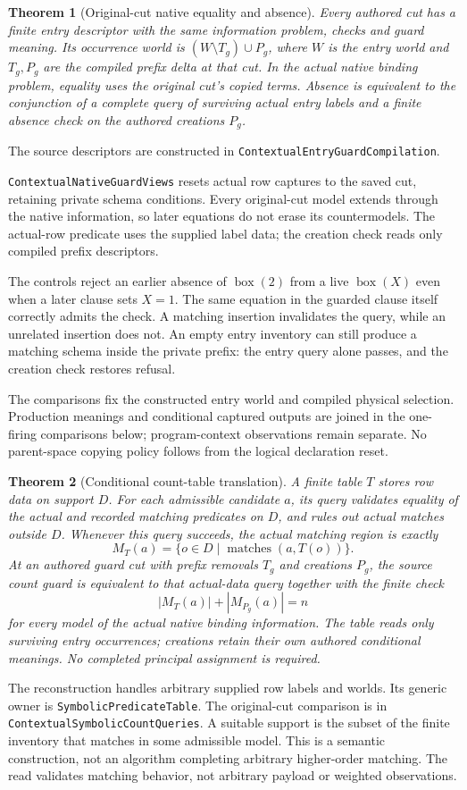 \documentclass[11pt]{article}
\newtheorem{theorem}{Theorem}
\newcommand{\code}[1]{\texttt{\small #1}}
\begin{document}
\begin{theorem}[Original-cut native equality and absence]
Every authored cut has a finite entry descriptor with the same information
problem, checks and guard meaning. Its occurrence world is
$(W\setminus T_g)\cup P_g$, where $W$ is the entry world and $T_g,P_g$ are
the compiled prefix delta at that cut. In the actual native binding
problem, equality uses the original cut's copied terms. Absence is
equivalent to the conjunction of a complete query of surviving actual
entry labels and a finite absence check on the authored creations $P_g$.
\end{theorem}
The source descriptors are constructed in
\code{ContextualEntryGuardCompilation}.

\code{ContextualNativeGuardViews} resets actual row captures to the saved
cut, retaining private schema conditions. Every original-cut model extends
through the native information, so later equations do not erase its
countermodels. The actual-row predicate uses the supplied label data;
the creation check reads only compiled prefix descriptors.

The controls reject an earlier absence of $\operatorname{box}(2)$ from a
live $\operatorname{box}(X)$ even when a later clause sets $X=1$.
The same equation in the guarded clause itself correctly admits the check.
A matching insertion invalidates the query, while an unrelated insertion
does not. An empty entry inventory can still produce a matching schema
inside the private prefix: the entry query alone passes, and the creation
check restores refusal.

The comparisons fix the constructed entry world and compiled physical
selection. Production meanings and conditional captured outputs are joined
in the one-firing comparisons below; program-context observations remain
separate. No parent-space copying policy follows
from the logical declaration reset.

\begin{theorem}[Conditional count-table translation]
A finite table $T$ stores row data on support $D$. For each admissible
candidate $a$, its query validates equality of the actual and recorded
matching predicates on $D$, and rules out actual matches outside $D$.
Whenever this query succeeds, the actual matching region is exactly
\[
 M_T(a)=\{o\in D\mid\operatorname{matches}(a,T(o))\}.
\]
At an authored guard cut with prefix removals $T_g$ and creations $P_g$,
the source count guard is equivalent to that actual-data query together
with the finite check
\[
 |M_T(a)|+|M_{P_g}(a)|=n
\]
for every model of the actual native binding information. The table reads
only surviving entry occurrences; creations retain their own authored
conditional meanings. No completed principal assignment is required.
\end{theorem}
The reconstruction handles arbitrary supplied row labels and worlds.
Its generic owner is \code{SymbolicPredicateTable}.
The original-cut comparison is in
\code{ContextualSymbolicCountQueries}. A suitable support is the subset of
the finite inventory that matches in some admissible model. This is a
semantic construction, not an algorithm completing arbitrary higher-order
matching. The read validates matching behavior, not arbitrary payload or
weighted observations.
\end{document}
